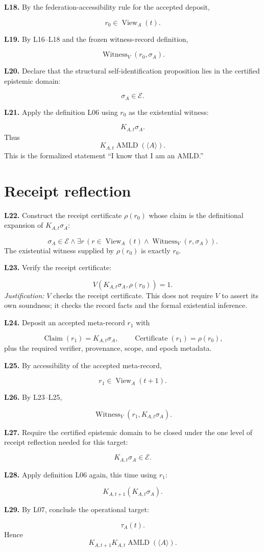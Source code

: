 \documentclass[11pt]{article}
\newcommand{\AMLD}{\operatorname{AMLD}}
\newcommand{\View}{\operatorname{View}}
\newcommand{\Witness}{\operatorname{Witness}}
\newcommand{\Claim}{\operatorname{Claim}}
\newcommand{\Certificate}{\operatorname{Certificate}}
\newcommand{\vcline}[2]{%
  \par\medskip
  \noindent\textbf{#1.} #2\par
}
\begin{document}
\vcline{L18}{By the federation-accessibility rule for the accepted deposit,}
\[
r_0\in\View_A(t).
\]

\vcline{L19}{By L16--L18 and the frozen witness-record definition,}
\[
\Witness_V(r_0,\sigma_A).
\]

\vcline{L20}{Declare that the structural self-identification proposition lies in the certified epistemic domain:}
\[
\sigma_A\in\mathcal E.
\]

\vcline{L21}{Apply the definition L06 using $r_0$ as the existential witness:}
\[
\boxed{K_{A,t}\sigma_A}.
\]
Thus
\[
\boxed{K_{A,t}\AMLD(\langle A\rangle)}.
\]
This is the formalized statement ``I know that I am an AMLD.''

\section*{Receipt reflection}

\vcline{L22}{Construct the receipt certificate $\rho(r_0)$ whose claim is the definitional expansion of $K_{A,t}\sigma_A$:}
\[
\sigma_A\in\mathcal E
\wedge
\exists r\,
\left(
r\in\View_A(t)
\wedge
\Witness_V(r,\sigma_A)
\right).
\]
The existential witness supplied by $\rho(r_0)$ is exactly $r_0$.

\vcline{L23}{Verify the receipt certificate:}
\[
V(K_{A,t}\sigma_A,\rho(r_0))=1.
\]
\emph{Justification:} $V$ checks the receipt certificate. This does not require $V$ to assert its own soundness; it checks the record facts and the formal existential inference.

\vcline{L24}{Deposit an accepted meta-record $r_1$ with}
\[
\Claim(r_1)=K_{A,t}\sigma_A,
\qquad
\Certificate(r_1)=\rho(r_0),
\]
plus the required verifier, provenance, scope, and epoch metadata.

\vcline{L25}{By accessibility of the accepted meta-record,}
\[
r_1\in\View_A(t+1).
\]

\vcline{L26}{By L23--L25,}
\[
\Witness_V(r_1,K_{A,t}\sigma_A).
\]

\vcline{L27}{Require the certified epistemic domain to be closed under the one level of receipt reflection needed for this target:}
\[
K_{A,t}\sigma_A\in\mathcal E.
\]

\vcline{L28}{Apply definition L06 again, this time using $r_1$:}
\[
\boxed{
K_{A,t+1}\!\left(K_{A,t}\sigma_A\right)
}.
\]

\vcline{L29}{By L07, conclude the operational target:}
\[
\boxed{\tau_A(t)}.
\]
Hence
\[
\boxed{
K_{A,t+1}K_{A,t}\AMLD(\langle A\rangle)
}.
\]
\end{document}
